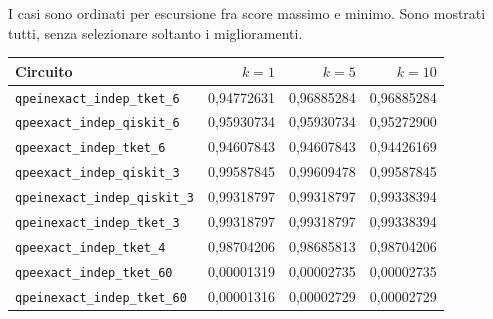 \documentclass[a4paper,10pt]{article}
\begin{document}
I casi sono ordinati per escursione fra score massimo e minimo. Sono mostrati tutti, senza selezionare soltanto i miglioramenti.\par\begingroup\small\renewcommand{\arraystretch}{1.18}\setlength{\tabcolsep}{5pt}
\begin{tabularx}{\linewidth}{Xrrr}\toprule
Circuito & $k=1$ & $k=5$ & $k=10$\\\midrule
\nolinkurl{qpeinexact_indep_tket_6} & 0,94772631 & 0,96885284 & 0,96885284\\
\nolinkurl{qpeexact_indep_qiskit_6} & 0,95930734 & 0,95930734 & 0,95272900\\
\nolinkurl{qpeexact_indep_tket_6} & 0,94607843 & 0,94607843 & 0,94426169\\
\nolinkurl{qpeexact_indep_qiskit_3} & 0,99587845 & 0,99609478 & 0,99587845\\
\nolinkurl{qpeinexact_indep_qiskit_3} & 0,99318797 & 0,99318797 & 0,99338394\\
\nolinkurl{qpeinexact_indep_tket_3} & 0,99318797 & 0,99318797 & 0,99338394\\
\nolinkurl{qpeexact_indep_tket_4} & 0,98704206 & 0,98685813 & 0,98704206\\
\nolinkurl{qpeexact_indep_tket_60} & 0,00001319 & 0,00002735 & 0,00002735\\
\nolinkurl{qpeinexact_indep_tket_60} & 0,00001316 & 0,00002729 & 0,00002729\\
\bottomrule\end{tabularx}\endgroup\par
\end{document}
